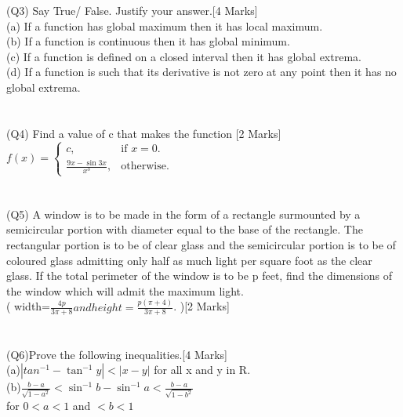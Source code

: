 \documentclass[12pt]{article}
\begin{document}
{(Q3)  Say True/ False. Justify your answer.\hspace*{4cm}[4 Marks]
\\(a) If a function has global maximum then it has local maximum.
\\(b) If a function is continuous then it has global minimum.
\\(c) If a function is defined on a closed interval then it has global extrema.
\\(d) If a function is such that its derivative is not zero at any point then it has no global extrema.\\\\\\

(Q4) Find a value of c that makes the function \hspace*{3cm}[2 Marks]\\
\begin{math}
  f(x)=\left\{
    \begin{array}{ll}
      c ,  & \mbox{if $x=0$}.\\
      \frac{9x - \sin 3x}{x^3}, & \mbox{otherwise}.
    \end{array}
  \right.
\end{math}\\\\\\

(Q5) A window is to be made in the form of a rectangle surmounted by a semicircular portion with diameter equal to the base of the rectangle. The rectangular portion is to be of clear glass and the semicircular portion is to be of coloured glass admitting only half as much light per square foot as the clear glass. If the total perimeter of the window is to be p feet, find the dimensions of the window which will admit the maximum light.
\\( width=$ \frac{4p} {3\pi +8} and height = \frac{p(\pi +4)}{3\pi +8}$. )\hspace*{6.1cm}[2 Marks]\\\\\\

(Q6)Prove the following inequalities.\hspace*{5cm}[4 Marks]
\\(a)$|tan ^{-1}- \tan ^{-1}y|<|x-y|$ for all x and y in R.
\\(b)$\frac{b-a}{\sqrt{1-a^2}}< \sin ^{-1}b -\sin ^{-1}a <\frac{b-a}{\sqrt{1-b^2}} $ \\ \hspace*{0.6cm} for $0<a<1$  and  $<b<1$

}
\end{document}
